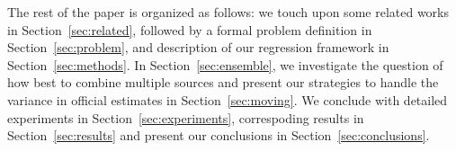 The rest of the paper is organized as follows: we touch upon some related works in 
Section~\ref{sec:related}, followed by a formal problem definition in Section~\ref{sec:problem},
and description of our regression framework in Section~\ref{sec:methods}. In Section~\ref{sec:ensemble}, 
we investigate the question of how best to combine multiple sources and present our strategies to 
handle the variance in official estimates in Section~\ref{sec:moving}. We conclude with detailed 
experiments in Section~\ref{sec:experiments}, correspoding results in Section~\ref{sec:results} and present
our conclusions in Section~\ref{sec:conclusions}.

